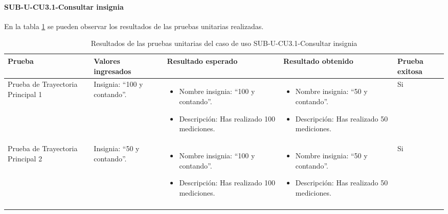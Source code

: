 \paragraph{SUB-U-CU3.1-Consultar insignia}\label{SUB-U-CU3.1:Pruebas}
En la tabla \ref{pruebas_unitarias_sub-u-cu3.1} se pueden observar los resultados de las pruebas unitarias realizadas.
\begin{longtable}{|M{2cm}| M{4.5cm}|M{3cm}|M{3cm}|M{1.5cm}|}
	\hline
	\textbf{Prueba} & \textbf{Valores ingresados} & \textbf{Resultado esperado} & \textbf{Resultado obtenido} & \textbf{Prueba exitosa} \\ \hline
	Prueba de Trayectoria Principal 1 & Insignia: ``100 y contando''.
	& 
	\begin{itemize}
		\item Nombre insignia: ``100 y contando''.
		\item Descripción: Has realizado 100 mediciones.
	\end{itemize}
	&
	\begin{itemize}
		\item Nombre insignia: ``50 y contando''.
		\item Descripción: Has realizado 50 mediciones.
	\end{itemize}
	& Si \\ \hline

	Prueba de Trayectoria Principal 2 & Insignia: ``50 y contando''.
	& 
	\begin{itemize}
		\item Nombre insignia: ``100 y contando''.
		\item Descripción: Has realizado 100 mediciones.
	\end{itemize}
	&
	\begin{itemize}
		\item Nombre insignia: ``50 y contando''.
		\item Descripción: Has realizado 50 mediciones.
	\end{itemize}
	& Si \\ \hline

	\caption{Resultados de las pruebas unitarias del caso de uso SUB-U-CU3.1-Consultar insignia}
	\label{pruebas_unitarias_sub-u-cu3.1}
\end{longtable}